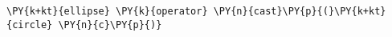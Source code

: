 \begin{Verbatim}[commandchars=\\\{\}]
    \PY{k+kt}{ellipse} \PY{k}{operator} \PY{n}{cast}\PY{p}{(}\PY{k+kt}{circle} \PY{n}{c}\PY{p}{)}
\end{Verbatim}
